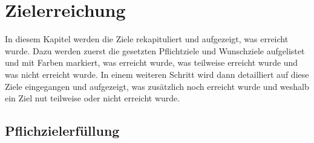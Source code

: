 
\section{Zielerreichung}
\label{sec:Zielerreichung}

In diesem Kapitel werden die Ziele rekapituliert und aufgezeigt, was erreicht wurde. Dazu werden zuerst die gesetzten Pflichtziele und Wunschziele aufgelistet und mit Farben markiert, was erreicht wurde, was teilweise erreicht wurde und was nicht erreicht wurde. In einem weiteren Schritt wird dann detailliert auf diese Ziele eingegangen und aufgezeigt, was zusätzlich noch erreicht wurde und weshalb ein Ziel nut teilweise oder nicht erreicht wurde.



\subsection{Pflichzielerfüllung}
\label{subsubsec:Pflichtzielerfüllung}

